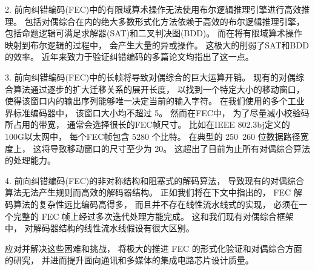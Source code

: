 2. 前向纠错编码(FEC)中的有限域算术操作无法使用布尔逻辑推理引擎进行高效推理。
包括对偶综合在内的绝大多数形式化方法依赖于高效的布尔逻辑推理引擎，
包括命题逻辑可满足求解器(SAT)和二叉判决图(BDD)。
而在将有限域算术操作映射到布尔逻辑的过程中，
会产生大量的异或操作。
这极大的削弱了SAT和BDD的效率。
近年来致力于验证纠错编码的多篇论文均指出了这一点。

3. 前向纠错编码(FEC)中的长帧将导致对偶综合的巨大运算开销。
现有的对偶综合算法通过逐步的扩大迁移关系的展开长度，
以找到一个特定大小的移动窗口，
使得该窗口内的输出序列能够唯一决定当前的输入字符。
在我们使用的多个工业界标准编码器中，
该窗口大小均不超过 5。
然而在FEC中，
为了尽量减小校验码所占用的带宽，
通常会选择很长的FEC帧尺寸。
比如在IEEE 802.3bj定义的 100G以太网中，
每个FEC帧包含 5280 个比特。
在典型的 250~260 位数据路径宽度上，
这将导致移动窗口的尺寸至少为 20。
这超出了目前为止所有对偶综合算法的处理能力。


4. 前向纠错编码(FEC)的非对称结构和阻塞式的解码算法，
导致现有的对偶综合算法无法产生规则而高效的解码器结构。
正如我们将在下文中指出的，
FEC 解码算法的复杂性远比编码高得多，
而且并不存在线性流水线式的实现，
必须在一个完整的 FEC 帧上经过多次迭代处理方能完成。
这和我们现有对偶综合框架中，
对解码器结构的线性流水线假设有很大区别。

应对并解决这些困难和挑战，
将极大的推进 FEC 的形式化验证和对偶综合方面的研究，
并进而提升面向通讯和多媒体的集成电路芯片设计质量。


